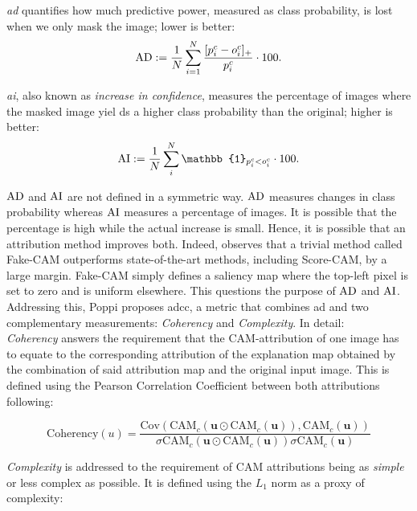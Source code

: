 \noindent \emph{\gls{ad}}  quantifies how much predictive power, measured as class probability, 
is lost when we only mask the image; lower is better:
\begin{equation}
	\operatorname{AD} \mathrel{:=} \frac{1}{N} \sum_{i=1}^N \frac{[p^c_i - o^c_i]_+}{p^c_i} \cdot 100.
\label{eq:ad}
\end{equation}

\noindent \emph{\gls{ai}}, also known as \emph{increase in confidence}, measures the 
percentage of images where the masked image yiel ds a higher class probability than the original; 
higher is better:
\begin{equation}
	\AI \defn \frac{1}{N} \sum_i^N \mathbb{1}_{p^c_i < o^c_i} \cdot 100.
\label{eq:ai}
\end{equation}

$\operatorname{AD}$ and $\operatorname{AI}$ are not defined in a symmetric way. $\operatorname{AD}$ measures changes in class probability 
whereas $\operatorname{AI}$ measures a percentage of images. It is possible that the percentage is high while 
the actual increase is small. Hence, it is possible that an attribution method improves both. 
Indeed, \autocite{poppi2021revisiting} observes that a trivial method called Fake-CAM outperforms 
state-of-the-art methods, including Score-CAM, by a large margin. Fake-CAM simply defines a 
saliency map where the top-left pixel is set to zero and is uniform elsewhere. 
This questions the purpose of $\operatorname{AD}$ and $\operatorname{AI}$. Addressing this, Poppi proposes \gls{adcc}, a metric 
that combines \gls{ad} and two complementary measurements: \emph{Coherency} and \emph{Complexity}.
In detail:\\

\noindent \emph{Coherency} answers the requirement that the CAM-attribution of one image has to 
equate to the corresponding attribution of the explanation map obtained by the combination of said 
attribution map and the original input image. This is defined using the Pearson Correlation 
Coefficient between both attributions following:

\begin{equation}
	\mbox{Coherency}(u) = \frac{\mbox{Cov}\left(\mbox{CAM}_c(\mathbf{u}\odot \mbox{CAM}_c(\mathbf{u})),
	                       \mbox{CAM}_c(\mathbf{u})\right)}{\sigma\mbox{CAM}_c(\mathbf{u}
						   \odot \mbox{CAM}_c(\mathbf{u}))\sigma\mbox{CAM}_c(\mathbf{u})}
\end{equation}

\noindent\emph{Complexity} is addressed to the requirement of CAM attributions being as 
\emph{simple} or less complex as possible. It is defined using the $L_1$ norm as a proxy of 
complexity:

